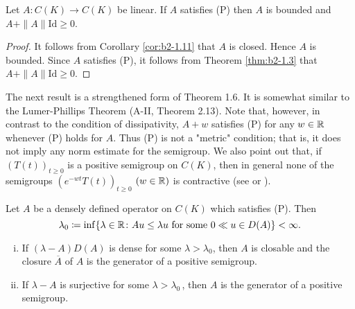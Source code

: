 \begin{corollary}\label{cor:b2-1.12}
Let $A \colon C(K) \to C(K)$ be linear.
If $A$ satisfies (P) then $A$ is bounded and $A + \|A\|\text{Id} \geq 0$.
\end{corollary}

\begin{proof}
It follows from Corollary \ref{cor:b2-1.11} that $A$ is closed.
Hence $A$ is bounded.
Since $A$ satisfies (P), it follows from Theorem \ref{thm:b2-1.3} that $A + \|A\|\text{Id} \geq 0$.
\end{proof}

The next result is a strengthened form of Theorem 1.6.
It is somewhat similar to the Lumer-Phillips Theorem (A-II, Theorem 2.13).
Note that, however, in contrast to the condition of dissipativity, $A + w$ satisfies (P) for any $w \in \mathbb{R}$ whenever (P) holds for $A$.
Thus (P) is not a "metric" condition; that is, it does not imply any norm estimate for the semigroup.
We also point out that, if $(T(t))_{t \geq 0}$ is a positive semigroup on $C(K)$, then in general none of the semigroups $(e^{-wt}T(t))_{t \geq 0}$ $(w \in \mathbb{R})$ is contractive (see \citet{battydavies:1983} or \citet{derndinger:1983}).

\begin{theorem}\label{thm:b2-1.13}
Let $A$ be a densely defined operator on $C(K)$ which satisfies (P).
Then
\[
    \lambda_{0} \coloneqq \inf\{\lambda \in \mathbb{R} \colon Au \leq \lambda u \text{ for some } 0 \ll u \in D(A)\} < \infty.
\]
\begin{enumerate}[(i)]
\item \label{thm:b2-1.13-1}
If $(\lambda - A)D(A)$ is dense for some $\lambda > \lambda_{0}$, then $A$ is closable and the closure $\overline{A}$ of $A$ is the generator of a positive semigroup.

\item \label{thm:b2-1.13-2}
If $\lambda - A$ is surjective for some $\lambda > \lambda_{0}$\,, then $A$ is the generator of a positive semigroup.
\end{enumerate}
\end{theorem}

